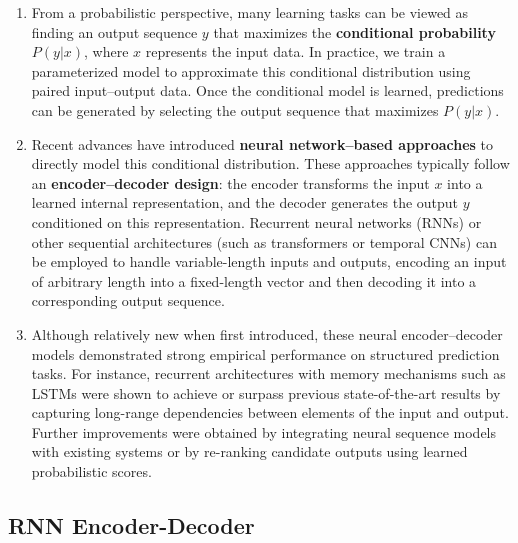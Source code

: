 \begin{enumerate}
    \item From a probabilistic perspective, many learning tasks can be viewed as finding an output sequence $y$ that maximizes the \textbf{conditional probability} $P(y|x)$, where $x$ represents the input data.
    In practice, we train a parameterized model to approximate this conditional distribution using paired input–output data. 
    Once the conditional model is learned, predictions can be generated by selecting the output sequence that maximizes $P(y|x)$.
    \hfill \cite{arxiv/1409.0473/NMT-Jointly-Learning-Align-Translate, common/online/chatgpt}

    \item Recent advances have introduced \textbf{neural network–based approaches} to directly model this conditional distribution. 
    These approaches typically follow an \textbf{encoder–decoder design}: the encoder transforms the input $x$ into a learned internal representation, and the decoder generates the output $y$ conditioned on this representation.
    Recurrent neural networks (RNNs) or other sequential architectures (such as transformers or temporal CNNs) can be employed to handle variable-length inputs and outputs, encoding an input of arbitrary length into a fixed-length vector and then decoding it into a corresponding output sequence.
    \hfill \cite{arxiv/1409.0473/NMT-Jointly-Learning-Align-Translate, common/online/chatgpt}

    \item Although relatively new when first introduced, these neural encoder–decoder models demonstrated strong empirical performance on structured prediction tasks.
    For instance, recurrent architectures with memory mechanisms such as LSTMs were shown to achieve or surpass previous state-of-the-art results by capturing long-range dependencies between elements of the input and output.
    Further improvements were obtained by integrating neural sequence models with existing systems or by re-ranking candidate outputs using learned probabilistic scores.
    \hfill \cite{arxiv/1409.0473/NMT-Jointly-Learning-Align-Translate, common/online/chatgpt}
\end{enumerate}


\subsection{RNN Encoder-Decoder}


